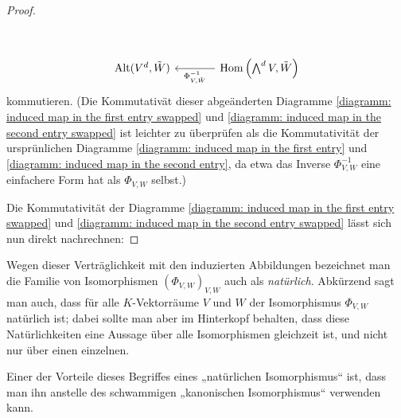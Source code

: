 \begin{remark}
\begin{proof}
\begin{gather}
\begin{tikzcd}[sep = large, ampersand replacement = \&]
        \\
            \Alt( V^d, \tilde{W} )
        \&  \Hom\left( \exteriorpower{d}{V}, \tilde{W} \right)
            \arrow{l}{\Phi_{V,\tilde{W}}^{-1}}
      \end{tikzcd}
    \end{gather}
    kommutieren.
    (Die Kommutativät dieser abgeänderten Diagramme \eqref{diagramm: induced map in the first entry swapped} und \eqref{diagramm: induced map in the second entry swapped} ist leichter zu überprüfen als die Kommutativität der ursprünlichen Diagramme \eqref{diagramm: induced map in the first entry} und \eqref{diagramm: induced map in the second entry}, da etwa das Inverse $\Phi_{V,W}^{-1}$ eine einfachere Form hat als $\Phi_{V,W}$ selbst.)
    
    Die Kommutativität der Diagramme \eqref{diagramm: induced map in the first entry swapped} und \eqref{diagramm: induced map in the second entry swapped} lässt sich nun direkt nachrechnen:
  \end{proof}
  
  Wegen dieser Verträglichkeit mit den induzierten Abbildungen bezeichnet man die Familie von Isomorphismen $(\Phi_{V,W})_{V,W}$ auch als \emph{natürlich}.
  Abkürzend sagt man auch, dass für alle $K$-Vektorräume $V$ und $W$ der Isomorphismus $\Phi_{V,W}$ natürlich ist;
  dabei sollte man aber im Hinterkopf behalten, dass diese Natürlichkeiten eine Aussage über alle Isomorphismen gleichzeit ist, und nicht nur über einen einzelnen.
  
  Einer der Vorteile dieses Begriffes eines „natürlichen Isomorphismus“ ist, dass man ihn anstelle des schwammigen „kanonischen Isomorphismus“ verwenden kann.
  
  
\end{remark}














